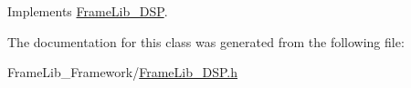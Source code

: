 Implements \hyperlink{class_frame_lib___d_s_p}{Frame\+Lib\+\_\+\+D\+SP}.



The documentation for this class was generated from the following file\+:\begin{DoxyCompactItemize}
\item 
Frame\+Lib\+\_\+\+Framework/\hyperlink{_frame_lib___d_s_p_8h}{Frame\+Lib\+\_\+\+D\+S\+P.\+h}\end{DoxyCompactItemize}
